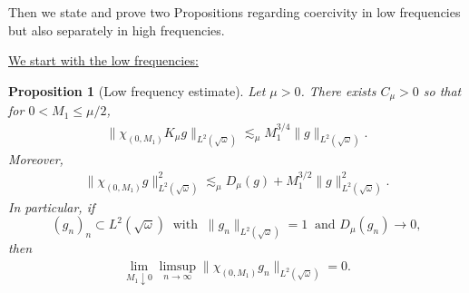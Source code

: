 \documentclass[reqno,11pt,letterpaper]{amsart}
\numberwithin{equation}{section}
\newtheorem{proposition}{Proposition}[section]
\begin{document}
Then we state and prove two Propositions regarding coercivity in low frequencies but also separately in high frequencies.

\underline{We start with the low frequencies:} 

\begin{proposition}[Low frequency estimate] \label{lemm:Tightness_zero}
    Let $\mu>0$. There exists $C_\mu>0$ so that for $0<M_1\leq \mu/2$, 
    \begin{align} \label{eq:Tightness_zero_1}
    \|\chi_{(0,M_1)}K_\mu g\|_{L^2(\sqrt{\omega})} \lesssim_\mu M_1^{3/4} \|g\|_{L^2(\sqrt{\omega})}. 
    \end{align}
    Moreover, 
    \begin{align} \label{eq:Tightness_zero_2}
        \|\chi_{(0,M_1)} g\|_{L^2(\sqrt{\omega})}^2 \lesssim_\mu D_\mu(g) +  M_1^{3/2} \|g\|_{L^2(\sqrt{\omega})}^2.
    \end{align}
    In particular, if 
    $$ (g_n)_n \subset L^2(\sqrt{\omega})\ \text{ with } \ \|g_n\|_{L^2(\sqrt{\omega})}=1 \ \text{ and }
    D_\mu(g_n)\to 0,$$
    then  
\begin{align}\label{eq:Tightness_zero_3}
\lim_{M_1\downarrow0}\limsup_{n\to\infty}
    \|\chi_{(0,M_1)}g_n\|_{L^2(\sqrt{\omega})}=0.
    \end{align}
\end{proposition}
\end{document}
